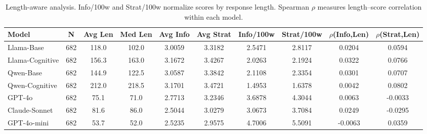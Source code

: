 \begin{table}[t]
\centering\small
\begin{tabular}{lccccccccc}
\toprule
Model & N & Avg Len & Med Len & Avg Info & Avg Strat & Info/100w & Strat/100w & $\rho$(Info,Len) & $\rho$(Strat,Len) \\
\midrule
Llama-Base & 682 & 118.0 & 102.0 & 3.0059 & 3.3182 & 2.5471 & 2.8117 & 0.0204 & 0.0594 \\
Llama-Cognitive & 682 & 156.3 & 163.0 & 3.1672 & 3.4267 & 2.0263 & 2.1924 & 0.0322 & 0.0766 \\
Qwen-Base & 682 & 144.9 & 122.5 & 3.0587 & 3.3842 & 2.1108 & 2.3354 & 0.0301 & 0.0707 \\
Qwen-Cognitive & 682 & 212.0 & 218.5 & 3.1701 & 3.4721 & 1.4953 & 1.6378 & 0.0042 & 0.0802 \\
GPT-4o & 682 & 75.1 & 71.0 & 2.7713 & 3.2346 & 3.6878 & 4.3044 & 0.0063 & -0.0033 \\
Claude-Sonnet & 682 & 81.6 & 86.0 & 2.5044 & 3.0279 & 3.0673 & 3.7084 & 0.0249 & -0.0295 \\
GPT-4o-mini & 682 & 53.7 & 52.0 & 2.5235 & 2.9575 & 4.7006 & 5.5091 & -0.0063 & 0.0359 \\
\bottomrule
\end{tabular}
\caption{Length-aware analysis. Info/100w and Strat/100w normalize scores by response length. Spearman $\rho$ measures length--score correlation within each model.}
\label{tab:length_analysis}
\end{table}
